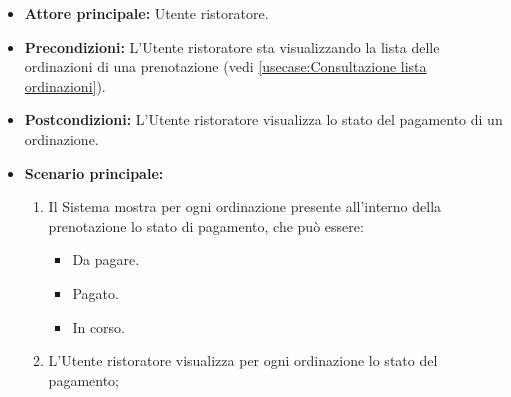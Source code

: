 \label{usecase:Visualizza stato di pagamento}
\begin{itemize}
	
    \item \textbf{Attore principale:} Utente ristoratore.

	\item \textbf{Precondizioni:} L'Utente ristoratore sta visualizzando la lista delle ordinazioni di una prenotazione (vedi \autoref{usecase:Consultazione lista ordinazioni}).

	\item \textbf{Postcondizioni:} L'Utente ristoratore visualizza lo stato del pagamento di un ordinazione.

	\item \textbf{Scenario principale:}
	\begin{enumerate}
		\item Il Sistema mostra per ogni ordinazione presente all'interno della prenotazione lo stato di pagamento, che può essere:
        \begin{itemize}
            \item Da pagare.
            \item Pagato.
            \item In corso.
        \end{itemize}
        \item L'Utente ristoratore visualizza per ogni ordinazione lo stato del pagamento;
	\end{enumerate}

\end{itemize}
